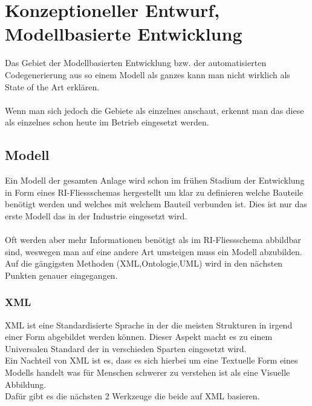 \section{Konzeptioneller Entwurf, Modellbasierte Entwicklung}
Das Gebiet der Modellbasierten Entwicklung bzw. der automatisierten Codegenerierung aus so einem Modell als ganzes kann man nicht wirklich als State of the Art erklären.\\
\\
Wenn man sich jedoch die Gebiete als einzelnes anschaut, erkennt man das diese als einzelnes schon heute im Betrieb eingesetzt werden.
\subsection{Modell}
Ein Modell der gesamten Anlage wird schon im frühen Stadium der Entwicklung in Form eines RI-Fliessschemas hergestellt um klar zu definieren welche Bauteile benötigt werden und welches mit welchem Bauteil verbunden ist. Dies ist nur das erste Modell das in der Industrie eingesetzt wird.\\
\\
Oft werden aber mehr Informationen benötigt als im RI-Fliessschema abbildbar sind, weswegen man auf eine andere Art umsteigen muss ein Modell abzubilden.\\
Auf die gängigsten Methoden (XML,Ontologie,UML) wird in den nächsten Punkten genauer eingegangen.
\subsubsection{XML}
XML ist eine Standardisierte Sprache in der die meisten Strukturen in irgend einer Form abgebildet werden können. Dieser Aspekt macht es zu einem Universalen Standard der in verschieden Sparten eingesetzt wird.\\
Ein Nachteil von XML ist es, dass es sich hierbei um eine Textuelle Form eines Modells handelt was für Menschen schwerer zu verstehen ist als eine Visuelle Abbildung.\\
Dafür gibt es die nächsten 2 Werkzeuge die beide auf XML basieren.
